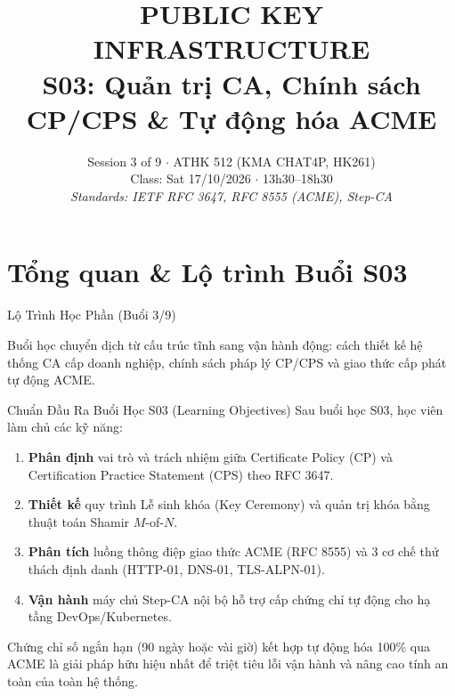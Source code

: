 
\title{\color{hcmutblue}\textbf{\LARGE PUBLIC KEY INFRASTRUCTURE}\\[0.25em]
       \color{hcmutblue}\textbf{\large S03: Quản trị CA, Chính sách CP/CPS \& Tự động hóa ACME}}
\date{\footnotesize Session 3 of 9 $\cdot$ ATHK 512 (KMA CHAT4P, HK261)\\
      Class: Sat 17/10/2026 $\cdot$ 13h30--18h30\\
      \textit{Standards: IETF RFC 3647, RFC 8555 (ACME), Step-CA}}


\PKItitleframe

\section{Tổng quan \& Lộ trình Buổi S03}

\begin{frame}{Lộ Trình Học Phần (Buổi 3/9)}
  \centering
  \vspace{0.4em}
  \raggedright\small
  Buổi học chuyển dịch từ cấu trúc tĩnh sang vận hành động: cách thiết kế hệ thống CA cấp doanh nghiệp, chính sách pháp lý CP/CPS và giao thức cấp phát tự động ACME.
\end{frame}

\begin{frame}{Chuẩn Đầu Ra Buổi Học S03 (Learning Objectives)}
  \small
  Sau buổi học S03, học viên làm chủ các kỹ năng:
  \begin{enumerate}
    \item \textbf{Phân định} vai trò và trách nhiệm giữa Certificate Policy (CP) và Certification Practice Statement (CPS) theo RFC 3647.
    \item \textbf{Thiết kế} quy trình Lễ sinh khóa (Key Ceremony) và quản trị khóa bằng thuật toán Shamir $M$-of-$N$.
    \item \textbf{Phân tích} luồng thông điệp giao thức ACME (RFC 8555) và 3 cơ chế thử thách định danh (HTTP-01, DNS-01, TLS-ALPN-01).
    \item \textbf{Vận hành} máy chủ Step-CA nội bộ hỗ trợ cấp chứng chỉ tự động cho hạ tầng DevOps/Kubernetes.
  \end{enumerate}

  \begin{keybox}
    Chứng chỉ số ngắn hạn (90 ngày hoặc vài giờ) kết hợp tự động hóa 100\% qua ACME là giải pháp hữu hiệu nhất để triệt tiêu lỗi vận hành và nâng cao tính an toàn của toàn hệ thống.
  \end{keybox}
\end{frame}

